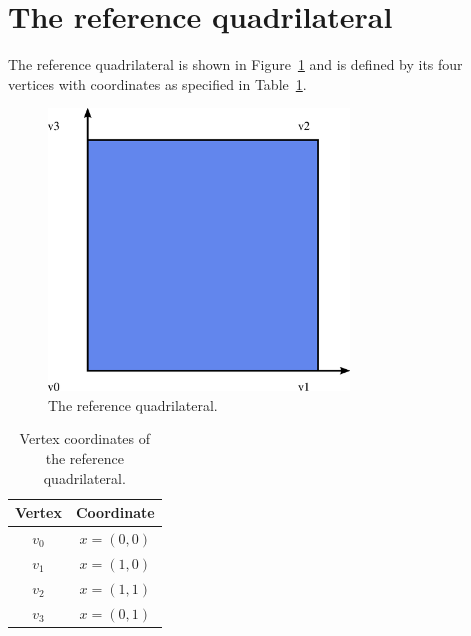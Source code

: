\newpage
\section{The reference quadrilateral}

The reference quadrilateral is shown in Figure~\ref{fig:quadrilateral}
and is defined by its four vertices with coordinates as specified in
Table~\ref{tab:quadrilateral,vertices}.

\begin{figure}[H]
  \begin{center}
    \includegraphics[width=8cm]{eps/quadrilateral.eps}
    \caption{The reference quadrilateral.}
    \label{fig:quadrilateral}
  \end{center}
\end{figure}

\begin{table}[H]
\linespread{1.2}\selectfont
  \begin{center}
    \begin{tabular}{|c|c|}
      \hline
      Vertex & Coordinate \\
      \hline
      \hline
      $v_0$ & $x = (0, 0)$ \\
      \hline
      $v_1$ & $x = (1, 0)$ \\
      \hline
      $v_2$ & $x = (1, 1)$ \\
      \hline
      $v_3$ & $x = (0, 1)$ \\
      \hline
    \end{tabular}
    \caption{Vertex coordinates of the reference quadrilateral.}
    \label{tab:quadrilateral,vertices}
  \end{center}
\end{table}

